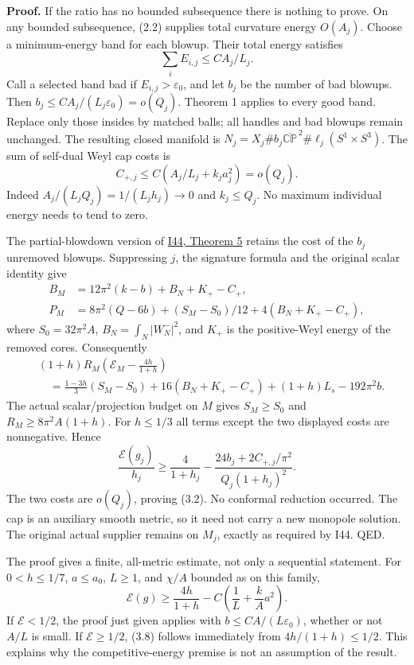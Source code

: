 \documentclass[
  10pt,
]{article}
\begin{document}
\textbf{Proof.} If the ratio has no bounded subsequence there is nothing
to prove. On any bounded subsequence, (2.2) supplies total curvature
energy \(O(A_j)\). Choose a minimum-energy band for each blowup. Their
total energy satisfies \[
                         \sum_i E_{i,j}\le CA_j/L_j.   \tag{3.3}
\] Call a selected band bad if \(E_{i,j}>\varepsilon_0\), and let
\(b_j\) be the number of bad blowups. Then
\(b_j\le CA_j/(L_j\varepsilon_0)=o(Q_j)\). Theorem 1 applies to every
good band. Replace only those insides by matched balls; all handles and
bad blowups remain unchanged. The resulting closed manifold is
\(N_j=X_j\#b_j\overline{\mathbb{CP}}^{\,2}  \#\ell_j(S^1\times S^3)\).
The sum of self-dual Weyl cap costs is \[
 C_{+,j}\le C\left(A_j/L_j+k_j a_j^2\right)=o(Q_j).    \tag{3.4}
\] Indeed \(A_j/(L_jQ_j)=1/(L_jh_j)\to0\) and \(k_j\le Q_j\). No maximum
individual energy needs to tend to zero.

The partial-blowdown version of
\href{20260927_covering_geometry_and_sharp_subfamilies.md}{I44, Theorem
5} retains the cost of the \(b_j\) unremoved blowups. Suppressing \(j\),
the signature formula and the original scalar identity give \[
 \begin{aligned}
 B_M&=12\pi^2(k-b)+B_N+K_+-C_+,\\
 P_M&=8\pi^2(Q-6b)+(S_M-S_0)/12+4(B_N+K_+-C_+),
 \end{aligned}                                             \tag{3.5}
\] where \(S_0=32\pi^2A\), \(B_N=\int_N|W_N^-|^2\), and \(K_+\) is the
positive-Weyl energy of the removed cores. Consequently \[
\begin{aligned}
 &(1+h)R_M\left(\mathcal E_M-\frac{4h}{1+h}\right)\\
 &\quad=\frac{1-3h}{3}(S_M-S_0)+16(B_N+K_+-C_+)
                 +(1+h)L_s-192\pi^2b .
\end{aligned}                                             \tag{3.6}
\] The actual scalar/projection budget on \(M\) gives \(S_M\ge S_0\) and
\(R_M\ge8\pi^2A(1+h)\). For \(h\le1/3\) all terms except the two
displayed costs are nonnegative. Hence \[
 \frac{\mathcal E(g_j)}{h_j}\ge\frac4{1+h_j}
       -\frac{24b_j+2C_{+,j}/\pi^2}{Q_j(1+h_j)^2}.     \tag{3.7}
\] The two costs are \(o(Q_j)\), proving (3.2). No conformal reduction
occurred. The cap is an auxiliary smooth metric, so it need not carry a
new monopole solution. The original actual supplier remains on \(M_j\),
exactly as required by I44. QED.

The proof gives a finite, all-metric estimate, not only a sequential
statement. For \(0<h\le1/7\), \(a\le a_0\), \(L\ge1\), and \(\chi/A\)
bounded as on this family, \[
 \boxed{\mathcal E(g)\ge\frac{4h}{1+h}
                -C\left(\frac1L+\frac{k}{A}a^2\right).} \tag{3.8}
\] If \(\mathcal E<1/2\), the proof just given applies with
\(b\le CA/(L\varepsilon_0)\), whether or not \(A/L\) is small. If
\(\mathcal E\ge1/2\), (3.8) follows immediately from \(4h/(1+h)\le1/2\).
This explains why the competitive-energy premise is not an assumption of
the result.
\end{document}
